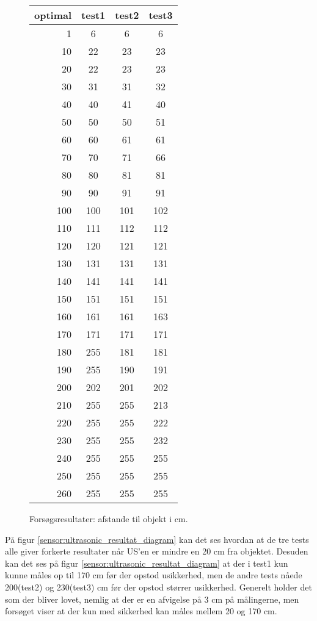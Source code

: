 \begin{figure}[h]
\centering
\begin{tabular}{r | c | c | c |}
optimal & test1 & test2 & test3 \\
\hline
1 & 6 & 6 & 6 \\
10&	22&	23&	23\\
20&	22&	23&	23\\
30&	31&	31&	32\\
40&	40&	41&	40\\
50&	50&	50&	51\\
60&	60&	61&	61\\
70&	70&	71&	66\\
80&	80&	81&	81\\
90&	90&	91&	91\\
100&	100&	101&	102\\
110&	111&	112&	112\\
120&	120&	121&	121\\
130&	131&	131&	131\\
140&	141&	141&	141\\
150&	151&	151&	151\\
160&	161&	161&	163\\
170&	171&	171&	171\\
180&	255&	181&	181\\
190&	255&	190&	191\\
200&	202&	201&	202\\
210&	255&	255&	213\\
220&	255&	255&	222\\
230&	255&	255&	232\\
240&	255&	255&	255\\
250&	255&	255&	255\\
260&	255&	255&	255\\
\end{tabular}
\caption{Forsøgsresultater: afstande til objekt i cm.}
\label{sensor:ultrasonic_test_data}
\end{figure}

På figur \ref{sensor:ultrasonic_resultat_diagram} kan det ses hvordan at de tre tests alle giver forkerte resultater når US'en er mindre en 20 cm fra objektet.
Desuden kan det ses på figur \ref{sensor:ultrasonic_resultat_diagram} at der i test1 kun kunne måles op til 170 cm før der opstod usikkerhed, men de andre tests nåede 200(test2) og 230(test3) cm før der opstod størrer usikkerhed.
Generelt holder det som der bliver lovet, nemlig at der er en afvigelse på 3 cm på målingerne, men forsøget viser at der kun med sikkerhed kan måles mellem 20 og 170 cm.

